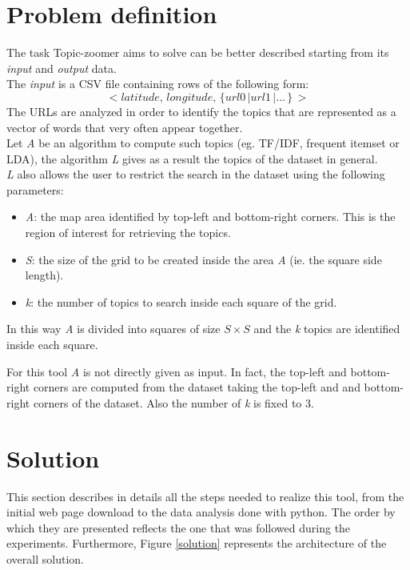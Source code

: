 \documentclass{sig-alternate-05-2015}
\begin{document}
\section{Problem definition}
The task Topic-zoomer aims to solve can be better described starting from its \emph{input} and \emph{output} data.\\
The \emph{input} is a CSV file containing rows of the following form:
\begin{equation}\label{dataset}
    <latitude,\,longitude,\,\{url0\,|url1\,|...\,\}\,>
\end{equation}
The URLs are analyzed in order to identify the topics that are represented as a vector of words that very often appear together.\\
Let \emph{A} be an algorithm to compute such topics (eg. TF/IDF, frequent itemset or LDA), the algorithm \emph{L} gives as a result the topics of the dataset in general.\\
\emph{L} also allows the user to restrict the search in the dataset using the following parameters:
\begin{itemize}
    \item \emph{A}: the map area identified by top-left and bottom-right corners. This is the region of interest for retrieving the topics.
    \item \emph{S}: the size of the grid to be created inside the area \emph{A} (ie. the square side length).
    \item \emph{k}: the number of topics to search inside each square of the grid.
\end{itemize}
In this way \emph{A} is divided into squares of size $S \times S$ and the \emph{k} topics are identified inside each square.

For this tool \emph{A} is not directly given as input. In fact, the top-left and bottom-right corners are computed from the dataset taking the top-left and and bottom-right corners of the dataset. Also the number of \emph{k} is fixed to 3.
\section{Solution}
This section describes in details all the steps needed to realize this tool, from the initial web page download to the data analysis done with python. The order by which they are presented reflects the one that was followed during the experiments. Furthermore, Figure \ref{solution} represents the architecture of the overall solution.
\end{document}

